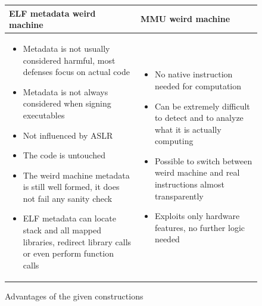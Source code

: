 \documentclass[11pt,twoside,a4paper]{article}
\begin{document}
\begin{figure}[ht!]
\begin{longtable}{ p{} | p{} }
\bfseries{ELF metadata weird machine} & \bfseries{MMU weird machine} \\ \hline
\begin{itemize}[noitemsep,topsep={0pt},partopsep={0pt}]
\item Metadata is not usually considered harmful, most defenses focus on actual code
\item Metadata is not always considered when signing executables
\item Not influenced by ASLR
\item The code is untouched
\item The weird machine metadata is still well formed, it does not fail any sanity check
\item ELF metadata can locate stack and all mapped libraries, redirect library calls or even perform function calls
\vspace{-0.5cm}
\end{itemize}
&
\begin{itemize}[noitemsep,topsep={0pt},partopsep={0pt}]
\item No native instruction needed for computation
\item Can be extremely difficult to detect and to analyze what it is actually computing
\item Possible to switch between weird machine and real instructions almost transparently
\item Exploits only hardware features, no further logic needed
\vspace{-0.5cm}
\end{itemize}
\end{longtable}
\caption{Advantages of the given constructions}
\vspace{-0.8cm}
\label{advantages}
\end{figure}
\end{document}
